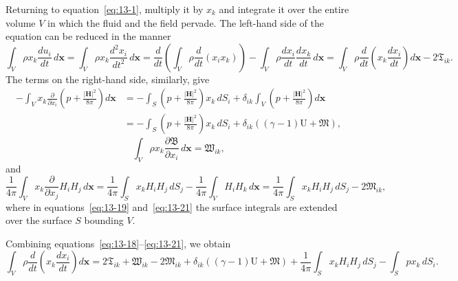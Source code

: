 Returning to equation~\eqref{eq:13-1}, multiply it by $x_k$ and integrate it over the entire volume $V$ in which the fluid and the field pervade. The left-hand side of the equation can be reduced in the manner
\begin{equation}
\label{eq:13-18}
\int_V \rho x_k \frac{du_i}{dt}\,d\mathbf{x} = \int_V \rho x_k \frac{d^2 x_i}{dt^2}\,d\mathbf{x} = \frac{d}{dt}\!\left(\int_V \rho \frac{d}{dt}(x_i x_k)\right) - \int_V \rho \frac{dx_i}{dt}\frac{dx_k}{dt}\,d\mathbf{x}
= \int_V \rho \frac{d}{dt}\!\left(x_k\frac{dx_i}{dt}\right)d\mathbf{x} - 2\mathfrak{T}_{ik}.
\end{equation}
The terms on the right-hand side, similarly, give
\begin{align}
\label{eq:13-19}
-\int_V x_k \frac{\partial}{\partial x_i}\!\left(p+\frac{|\mathbf{H}|^2}{8\pi}\right)d\mathbf{x}
&= -\int_S\!\left(p+\frac{|\mathbf{H}|^2}{8\pi}\right)x_k\,dS_i + \delta_{ik}\int_V\!\left(p+\frac{|\mathbf{H}|^2}{8\pi}\right)d\mathbf{x} \nonumber\\
&= -\int_S\!\left(p+\frac{|\mathbf{H}|^2}{8\pi}\right)x_k\,dS_i + \delta_{ik}((\gamma-1)\mathrm{U}+\mathfrak{M}),
\end{align}
\begin{equation}
\label{eq:13-20}
\int_V \rho x_k \frac{\partial\mathfrak{B}}{\partial x_i}\,d\mathbf{x} = \mathfrak{W}_{ik},
\end{equation}
and
\begin{equation}
\label{eq:13-21}
\frac{1}{4\pi}\int_V x_k \frac{\partial}{\partial x_j}H_i H_j\,d\mathbf{x} = \frac{1}{4\pi}\int_S x_k H_i H_j\,dS_j - \frac{1}{4\pi}\int_V H_i H_k\,d\mathbf{x}
= \frac{1}{4\pi}\int_S x_k H_i H_j\,dS_j - 2\mathfrak{M}_{ik},
\end{equation}
where in equations~\eqref{eq:13-19} and~\eqref{eq:13-21} the surface integrals are extended over the surface $S$ bounding $V$.

Combining equations~\eqref{eq:13-18}--\eqref{eq:13-21}, we obtain
\begin{equation}
\label{eq:13-22}
\int_V \rho \frac{d}{dt}\!\left(x_k\frac{dx_i}{dt}\right)d\mathbf{x}
= 2\mathfrak{T}_{ik} + \mathfrak{W}_{ik} - 2\mathfrak{M}_{ik} + \delta_{ik}((\gamma-1)\mathrm{U}+\mathfrak{M}) + \frac{1}{4\pi}\int_S x_k H_i H_j\,dS_j - \int_S px_k\,dS_i.
\end{equation}

